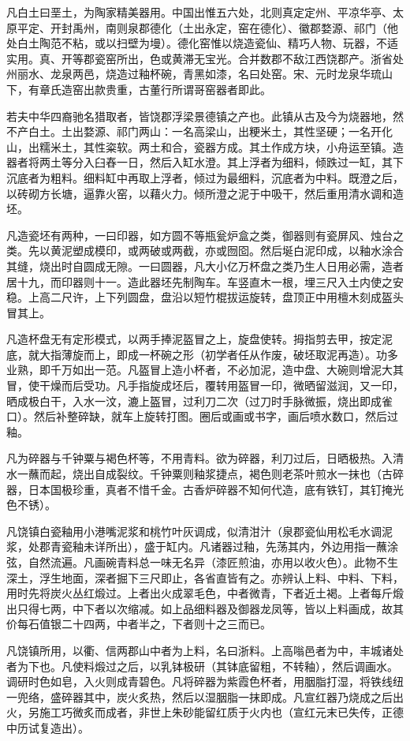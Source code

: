 \documentclass[12pt,UTF8]{ctexbook}
\begin{document}
凡白土曰垩土，为陶家精美器用。中国出惟五六处，北则真定定州、平凉华亭、太原平定、开封禹州，南则泉郡德化（土出永定，窑在德化）、徽郡婺源、祁门（他处白土陶范不粘，或以扫壁为墁）。德化窑惟以烧造瓷仙、精巧人物、玩器，不适实用。真、开等郡瓷窑所出，色或黄滞无宝光。合并数郡不敌江西饶郡产。浙省处州丽水、龙泉两邑，烧造过釉杯碗，青黑如漆，名曰处窑。宋、元时龙泉华琉山下，有章氏造窑出款贵重，古董行所谓哥窑器者即此。

若夫中华四裔驰名猎取者，皆饶郡浮梁景德镇之产也。此镇从古及今为烧器地，然不产白土。土出婺源、祁门两山：一名高梁山，出粳米土，其性坚硬；一名开化山，出糯米土，其性粢软。两土和合，瓷器方成。其土作成方块，小舟运至镇。造器者将两土等分入臼舂一日，然后入缸水澄。其上浮者为细料，倾跌过一缸，其下沉底者为粗料。细料缸中再取上浮者，倾过为最细料，沉底者为中料。既澄之后，以砖砌方长塘，逼靠火窑，以藉火力。倾所澄之泥于中吸干，然后重用清水调和造坯。

凡造瓷坯有两种，一曰印器，如方圆不等瓶瓮炉盒之类，御器则有瓷屏风、烛台之类。先以黄泥塑成模印，或两破或两截，亦或囫囵。然后埏白泥印成，以釉水涂合其缝，烧出时自圆成无隙。一曰圆器，凡大小亿万杯盘之类乃生人日用必需，造者居十九，而印器则十一。造此器坯先制陶车。车竖直木一根，埋三尺入土内使之安稳。上高二尺许，上下列圆盘，盘沿以短竹棍拔运旋转，盘顶正中用檀木刻成盔头冒其上。

凡造杯盘无有定形模式，以两手捧泥盔冒之上，旋盘使转。拇指剪去甲，按定泥底，就大指薄旋而上，即成一杯碗之形（初学者任从作废，破坯取泥再造）。功多业熟，即千万如出一范。凡盔冒上造小杯者，不必加泥，造中盘、大碗则增泥大其冒，使干燥而后受功。凡手指旋成坯后，覆转用盔冒一印，微晒留滋润，又一印，晒成极白干，入水一汶，漉上盔冒，过利刀二次（过刀时手脉微振，烧出即成雀口）。然后补整碎缺，就车上旋转打图。圈后或画或书字，画后喷水数口，然后过釉。

凡为碎器与千钟粟与褐色杯等，不用青料。欲为碎器，利刀过后，日晒极热。入清水一蘸而起，烧出自成裂纹。千钟粟则釉浆捷点，褐色则老茶叶煎水一抹也（古碎器，日本国极珍重，真者不惜千金。古香炉碎器不知何代造，底有铁钉，其钉掩光色不锈）。

凡饶镇白瓷釉用小港嘴泥浆和桃竹叶灰调成，似清泔汁（泉郡瓷仙用松毛水调泥浆，处郡青瓷釉未详所出），盛于缸内。凡诸器过釉，先荡其内，外边用指一蘸涂弦，自然流遍。凡画碗青料总一味无名异（漆匠煎油，亦用以收火色）。此物不生深土，浮生地面，深者掘下三尺即止，各省直皆有之。亦辨认上料、中料、下料，用时先将炭火丛红煅过。上者出火成翠毛色，中者微青，下者近土褐。上者每斤煅出只得七两，中下者以次缩减。如上品细料器及御器龙凤等，皆以上料画成，故其价每石值银二十四两，中者半之，下者则十之三而已。

凡饶镇所用，以衢、信两郡山中者为上料，名曰浙料。上高嗡邑者为中，丰城诸处者为下也。凡使料煅过之后，以乳钵极研（其钵底留粗，不转釉），然后调画水。调研时色如皂，入火则成青碧色。凡将碎器为紫霞色杯者，用胭脂打湿，将铁线纽一兜络，盛碎器其中，炭火炙热，然后以湿胭脂一抹即成。凡宣红器乃烧成之后出火，另施工巧微炙而成者，非世上朱砂能留红质于火内也（宣红元末已失传，正德中历试复造出）。
\end{document}
